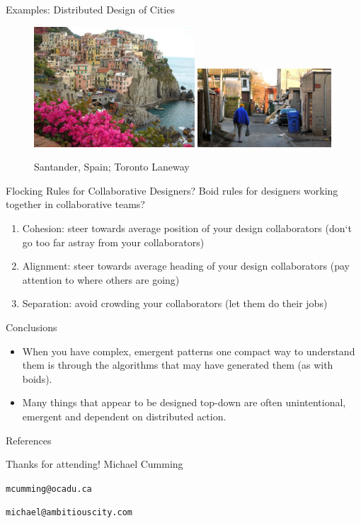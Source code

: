 \documentclass[handout]{beamer}
\begin{document}
\begin{frame}{Examples: Distributed Design of Cities}
\begin{figure}
\caption{Santander, Spain; Toronto Laneway}
  \includegraphics[width=6cm]{images/santander.JPG}
  \pause
    \includegraphics[width=5cm]{images/laneman.jpg}
  
  \label{fig:distributedCity}
\end{figure}
\end{frame}

\begin{frame}{Flocking Rules for Collaborative Designers?}
Boid rules for designers working together in collaborative teams?
\begin{enumerate}
\item Cohesion: steer towards average position of your design collaborators (don`t go too far astray from your collaborators)
\item Alignment: steer towards average heading of your design collaborators (pay attention to where others are going) 
\item Separation: avoid crowding your collaborators (let them do their jobs)
\end{enumerate}
\end{frame}

\begin{frame}{Conclusions}
\begin{itemize}
\item When you have complex, emergent patterns one compact way to understand them is through the algorithms that may have generated them (as with boids). 
\pause
\item Many things that appear to be designed top-down are often unintentional, emergent and dependent on distributed action.
\end{itemize}

\end{frame}

\begin{frame}{References}

\end{frame}

\begin{frame}{Thanks for attending!}
\bigskip
Michael Cumming

\texttt{mcumming@ocadu.ca}

\texttt{michael@ambitiouscity.com}

\end{frame}
\end{document}
